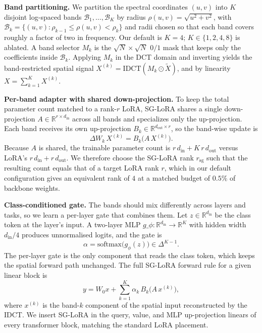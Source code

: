 \documentclass{article}
\begin{document}
\textbf{Band partitioning.} We partition the spectral coordinates
$(u,v)$ into $K$ disjoint log-spaced bands $\mathcal{B}_1,\dots,\mathcal{B}_K$
by radius $\rho(u,v) = \sqrt{u^2+v^2}$, with
$\mathcal{B}_k = \{(u,v) : \rho_{k-1} \le \rho(u,v) < \rho_k\}$ and
radii chosen so that each band covers roughly a factor of two in
frequency. Our default is $K=4$; $K \in \{1,2,4,8\}$ is ablated. A band
selector $M_k$ is the $\sqrt N \times \sqrt N$ $0/1$ mask that keeps
only the coefficients inside $\mathcal{B}_k$. Applying $M_k$ in the
DCT domain and inverting yields the band-restricted spatial signal
$X^{(k)} = \mathrm{IDCT}(M_k \odot \tilde X)$, and by linearity
$X = \sum_{k=1}^{K} X^{(k)}$.

\textbf{Per-band adapter with shared down-projection.} To keep the
total parameter count matched to a rank-$r$ LoRA, SG-LoRA shares a
single down-projection $A \in \mathbb{R}^{r \times d_{\text{in}}}$
across all bands and specializes only the up-projection. Each band
receives its own up-projection
$B_k \in \mathbb{R}^{d_{\text{out}} \times r}$, so the band-wise update
is
\begin{equation}
  \Delta W_k \, X^{(k)} = B_k \bigl( A \, X^{(k)} \bigr).
\end{equation}
Because $A$ is shared, the trainable parameter count is
$r\,d_{\text{in}} + K\,r\,d_{\text{out}}$ versus LoRA's
$r\,d_{\text{in}} + r\,d_{\text{out}}$. We therefore choose the SG-LoRA
rank $r_{\text{sg}}$ such that the resulting count equals that of a
target LoRA rank $r$, which in our default configuration gives an
equivalent rank of $4$ at a matched budget of $0.5\%$ of backbone
weights.

\textbf{Class-conditioned gate.} The bands should mix differently
across layers and tasks, so we learn a per-layer gate that combines
them. Let $z \in \mathbb{R}^{d_{\text{in}}}$ be the class token at the
layer's input. A two-layer MLP $g\_\phi: \mathbb{R}^{d_{\text{in}}}
\to \mathbb{R}^{K}$ with hidden width $d_{\text{in}}/4$ produces
unnormalised logits, and the gate is
\begin{equation}
  \alpha = \mathrm{softmax}\bigl(g_\phi(z)\bigr) \in \Delta^{K-1}.
\end{equation}
The per-layer gate is the only component that reads the class token,
which keeps the spatial forward path unchanged. The full SG-LoRA
forward rule for a given linear block is
\begin{equation}
  y = W_0 x + \sum_{k=1}^{K} \alpha_k \, B_k \bigl( A \, x^{(k)} \bigr),
\end{equation}
where $x^{(k)}$ is the band-$k$ component of the spatial input
reconstructed by the IDCT. We insert SG-LoRA in the query, value, and
MLP up-projection linears of every transformer block, matching the
standard LoRA placement.
\end{document}
